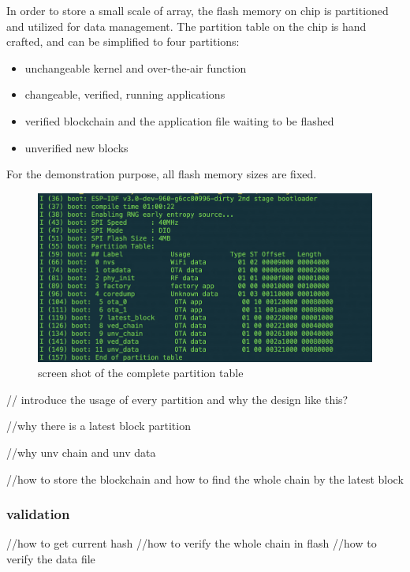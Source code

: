 \documentclass{article}
\begin{document}
          In order to store a small scale of array, the flash memory on chip is partitioned and utilized for data management. The partition table on the chip is hand crafted, and can be simplified to four partitions:
          \begin{itemize}
            \item unchangeable kernel and over-the-air function
            \item changeable, verified, running applications
            \item verified blockchain and the application file waiting to be flashed
            \item unverified new blocks
          \end{itemize}

          For the demonstration purpose, all flash memory sizes are fixed.

          \begin{figure}[h!]
            \centering
            \includegraphics[scale=0.1]{partitionTable}
            \caption{screen shot of the complete partition table}
            \label{fig:partition table}
          \end{figure}

          // introduce the usage of every partition and why the design like this?

          //why there is a latest block partition

          //why unv chain and unv data

          //how to store the blockchain and how to find the whole chain by the latest block


      \subsubsection{validation}
          //how to get current hash
          //how to verify the whole chain in flash
          //how to verify the data file
\end{document}
